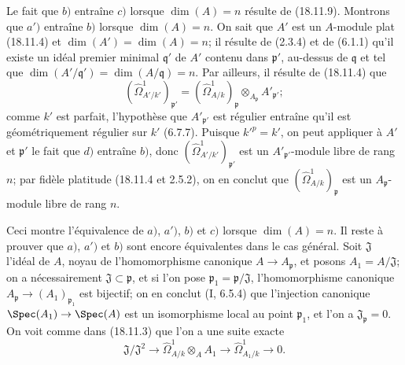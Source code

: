 Le fait que $b)$ entraîne $c)$ lorsque $\dim(A)=n$ résulte de (18.11.9). Montrons que $a')$ entraîne $b)$ lorsque $\dim(A)=n$. On sait que $A'$ est un $A$-module plat (18.11.4) et $\dim(A')=\dim(A)=n$; il résulte de (2.3.4) et de (6.1.1) qu'il existe un idéal premier minimal $\mathfrak q'$ de $A'$ contenu dans $\mathfrak p'$, au-dessus de $\mathfrak q$ et tel que $\dim(A'/\mathfrak q')=\dim(A/\mathfrak q)=n$. Par ailleurs, il résulte de (18.11.4) que
\[
  (\hat{\Omega}^1_{A'/k'})_{\mathfrak p'}=(\hat{\Omega}^1_{A/k})_{\mathfrak p}\otimes_{A_{\mathfrak p}}A'_{\mathfrak p'};
\]
comme $k'$ est parfait, l'hypothèse que $A'_{\mathfrak p'}$ est régulier entraîne qu'il est géométriquement régulier sur $k'$ (6.7.7). Puisque $k'^p=k'$, on peut appliquer à $A'$ et $\mathfrak p'$ le fait que $d)$ entraîne $b)$, donc $(\hat{\Omega}^1_{A'/k'})_{\mathfrak p'}$ est un $A'_{\mathfrak p'}$-module libre de rang $n$; par fidèle platitude (18.11.4 et 2.5.2), on en conclut que $(\hat{\Omega}^1_{A/k})_{\mathfrak p}$ est un $A_{\mathfrak p}$-module libre de rang $n$.

Ceci montre l'équivalence de $a)$, $a')$, $b)$ et $c)$ lorsque $\dim(A)=n$. Il reste à prouver que $a)$, $a')$ et $b)$ sont encore équivalentes dans le cas général. Soit $\mathfrak J$ l'idéal de $A$, noyau de l'homomorphisme canonique $A\to A_{\mathfrak p}$, et posons $A_1=A/\mathfrak J$; on a nécessairement $\mathfrak J\subset\mathfrak p$, et si l'on pose $\mathfrak p_1=\mathfrak p/\mathfrak J$, l'homomorphisme canonique $A_{\mathfrak p}\to(A_1)_{\mathfrak p_1}$ est bijectif; on en conclut (I, 6.5.4) que l'injection canonique $\Spec(A_1)\to\Spec(A)$ est un isomorphisme local au point $\mathfrak p_1$, et l'on a $\mathfrak J_{\mathfrak p}=0$. On voit comme dans (18.11.3) que l'on a une suite exacte
\[
  \mathfrak J/\mathfrak J^2\longrightarrow\hat{\Omega}^1_{A/k}\otimes_A A_1\longrightarrow\hat{\Omega}^1_{A_1/k}\longrightarrow0.
\]



